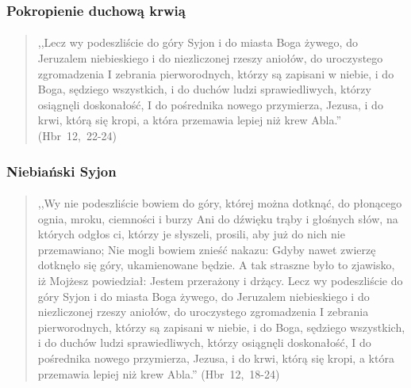 \documentclass[10pt,a4paper,oneside]{article}
\begin{document}
\subsubsection{Pokropienie duchową krwią}
\paragraph{}
\begin{quote}
,,Lecz wy podeszliście do góry Syjon i do miasta Boga żywego, do Jeruzalem niebieskiego i do niezliczonej rzeszy aniołów, do uroczystego zgromadzenia I zebrania pierworodnych, którzy są zapisani w niebie, i do Boga, sędziego wszystkich, i do duchów ludzi sprawiedliwych, którzy osiągnęli doskonałość, I do pośrednika nowego przymierza, Jezusa, i do krwi, którą się kropi, a która przemawia lepiej niż krew Abla.'' \mbox{(Hbr 12, 22-24)}
\end{quote}
\subsubsection{Niebiański Syjon}
\paragraph{}
\begin{quote}
,,Wy nie podeszliście bowiem do góry, której można dotknąć, do płonącego ognia, mroku, ciemności i burzy Ani do dźwięku trąby i głośnych słów, na których odgłos ci, którzy je słyszeli, prosili, aby już do nich nie przemawiano; Nie mogli bowiem znieść nakazu: Gdyby nawet zwierzę dotknęło się góry, ukamienowane będzie. A tak straszne było to zjawisko, iż Mojżesz powiedział: Jestem przerażony i drżący. Lecz wy podeszliście do góry Syjon i do miasta Boga żywego, do Jeruzalem niebieskiego i do niezliczonej rzeszy aniołów, do uroczystego zgromadzenia I zebrania pierworodnych, którzy są zapisani w niebie, i do Boga, sędziego wszystkich, i do duchów ludzi sprawiedliwych, którzy osiągnęli doskonałość, I do pośrednika nowego przymierza, Jezusa, i do krwi, którą się kropi, a która przemawia lepiej niż krew Abla.'' \mbox{(Hbr 12, 18-24)}
\end{quote}
\end{document}
